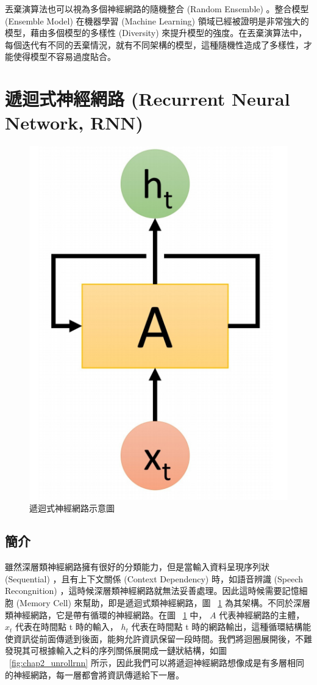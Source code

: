 丟棄演算法也可以視為多個神經網路的隨機整合 (Random Ensemble) 。整合模型 (Ensemble Model) 在機器學習 (Machine Learning) 領域已經被證明是非常強大的模型，藉由多個模型的多樣性 (Diversity) 來提升模型的強度。在丟棄演算法中，每個迭代有不同的丟棄情況，就有不同架構的模型，這種隨機性造成了多樣性，才能使得模型不容易過度貼合。

\section{遞迴式神經網路 (Recurrent Neural Network, RNN)}
\begin{figure}
    \centering
    \includegraphics[scale=0.3]{images/chap2_rnn.png}
    \caption{遞迴式神經網路示意圖}\label{fig:chap2_rnn}
\end{figure}
\subsection{簡介}
雖然深層類神經網路擁有很好的分類能力，但是當輸入資料呈現序列狀 (Sequential) ，且有上下文關係 (Context Dependency) 時，如語音辨識 (Speech Recongnition) ，這時候深層類神經網路就無法妥善處理。因此這時候需要記憶細胞 (Memory Cell) 來幫助，即是遞迴式類神經網路，圖 ~\ref{fig:chap2_rnn} 為其架構。不同於深層類神經網路，它是帶有循環的神經網路。在圖 ~\ref{fig:chap2_rnn} 中， $A$ 代表神經網路的主體， $x_t$ 代表在時間點 t 時的輸入， $h_t$ 代表在時間點 t 時的網路輸出，這種循環結構能使資訊從前面傳遞到後面，能夠允許資訊保留一段時間。我們將迴圈展開後，不難發現其可根據輸入之料的序列關係展開成一鏈狀結構，如圖 ~\ref{fig:chap2_unrollrnn} 所示，因此我們可以將遞迴神經網路想像成是有多層相同的神經網路，每一層都會將資訊傳遞給下一層。

